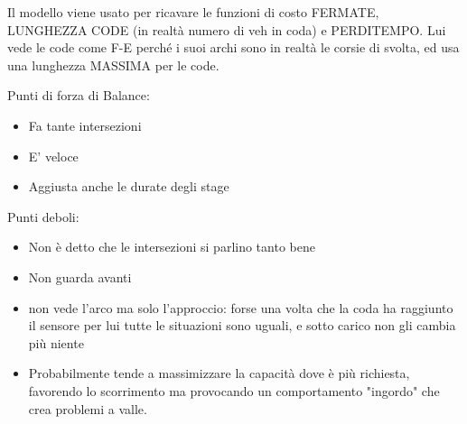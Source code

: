 Il modello viene usato per ricavare le funzioni di costo FERMATE, LUNGHEZZA CODE (in realtà numero di veh in coda) e PERDITEMPO.
Lui vede le code come F-E perché i suoi archi sono in realtà le corsie di svolta, ed usa una lunghezza MASSIMA per le code.

Punti di forza di Balance:
\begin{itemize}
\item Fa tante intersezioni
\item E' veloce
\item Aggiusta anche le durate degli stage
\end{itemize}

Punti deboli:
\begin{itemize}
\item Non è detto che le intersezioni si parlino tanto bene
\item Non guarda avanti
\item non vede l'arco ma solo l'approccio: forse una volta che la coda ha raggiunto il sensore per lui tutte le situazioni sono uguali, e sotto carico non gli cambia più niente
\item Probabilmente tende a massimizzare la capacità dove è più richiesta, favorendo lo scorrimento ma provocando un comportamento "ingordo" che crea problemi a valle.
\end{itemize}